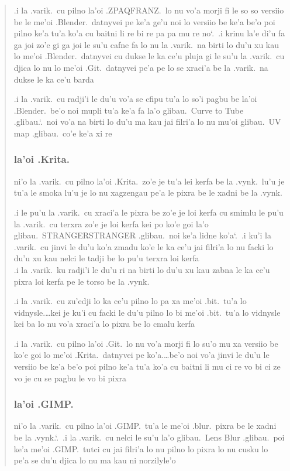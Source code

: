\documentclass{report}
\newcommand\sds{\spacefactor\sfcode`.\ \space}
\begin{document}
\begin{quote}
	.i la .varik.\ cu pilno la'oi .ZPAQFRANZ.\ lo nu vo'a morji fi le so so versiio be le me'oi .Blender.\ datnyvei pe ke'a ge'u noi lo versiio be ke'a be'o poi pilno ke'a tu'a ko'a cu baitni li re bi re pa pa mu re no\sds  .i krinu la'e di'u fa ga joi zo'e gi ga joi le su'u cafne fa lo nu la .varik.\ na birti lo du'u xu kau lo me'oi .Blender.\ datnyvei cu dukse le ka ce'u pluja gi le su'u la .varik.\ cu djica lo nu lo me'oi .Git.\ datnyvei pe'a pe lo se xraci'a be la .varik.\ na dukse le ka ce'u barda

	.i la .varik.\ cu radji'i le du'u vo'a se cfipu tu'a lo so'i pagbu be la'oi .Blender.\ be'o noi mupli tu'a ke'a fa la'o glibau.\ Curve to Tube .glibau.\sds noi vo'a na birti lo du'u ma kau jai filri'a lo nu mu'oi glibau.\ UV map .glibau.\ co'e ke'a xi re

	\subsubsection{la'oi .Krita.}
	ni'o la .varik.\ cu pilno la'oi .Krita.\ zo'e je tu'a lei kerfa be la .vynk.\ lu'u je tu'a le smoka lu'u je lo nu xagzengau pe'a le pixra be le xadni be la .vynk.

	.i le pu'u la .varik.\ cu xraci'a le pixra be zo'e je loi kerfa cu smimlu le pu'u la .varik.\ cu terxra zo'e je loi kerfa kei po ko'e goi la'o glibau.\ STRANGERSTRANGER .glibau.\ noi ke'a lidne ko'a\sds  .i ku'i la .varik.\ cu jinvi le du'u ko'a zmadu ko'e le ka ce'u jai filri'a lo nu facki lo du'u xu kau nelci le tadji be lo pu'u terxra loi kerfa\\
	.i la .varik.\ ku radji'i le du'u ri na birti lo du'u xu kau zabna le ka ce'u pixra loi kerfa pe le torso be la .vynk.

	.i la .varik.\ cu zu'edji lo ka ce'u pilno lo pa xa me'oi .bit.\ tu'a lo vidnysle.\ldots kei je ku'i cu facki le du'u pilno lo bi me'oi .bit.\ tu'a lo vidnysle kei ba lo nu vo'a xraci'a lo pixra be lo cmalu kerfa

	.i la .varik.\ cu pilno la'oi .Git.\ lo nu vo'a morji fi lo su'o mu xa versiio be ko'e goi lo me'oi .Krita.\ datnyvei pe ko'a.\ldots be'o noi vo'a jinvi le du'u le versiio be ke'a be'o poi pilno ke'a tu'a ko'a cu baitni li mu ci re vo bi ci ze vo je cu se pagbu le vo bi pixra

	\subsubsection{la'oi .GIMP.}
	ni'o la .varik.\ cu pilno la'oi .GIMP.\ tu'a le me'oi .blur.\ pixra be le xadni be la .vynk.\sds  .i la .varik.\ cu nelci le su'u la'o glibau.\ Lens Blur .glibau.\ poi ke'a me'oi .GIMP.\ tutci cu jai filri'a lo nu pilno lo pixra lo nu cusku lo pe'a se du'u djica lo nu ma kau ni norzilyle'o


\end{quote}
\end{document}
